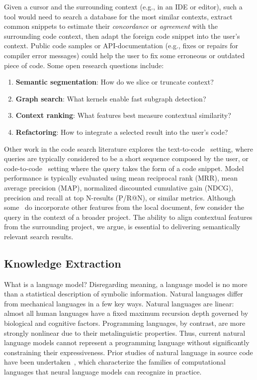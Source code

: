 \documentclass[12pt]{article}
\begin{document}
Given a cursor and the surrounding context (e.g., in an IDE or editor), such a tool would need to search a database for the most similar contexts, extract common snippets to estimate their \textit{concordance} or \textit{agreement} with the surrounding code context, then adapt the foreign code snippet into the user's context. Public code samples or API-documentation (e.g., fixes or repairs for compiler error messages) could help the user to fix some erroneous or outdated piece of code. Some open research questions include:

  \begin{enumerate}
    \item \textbf{Semantic segmentation}: How do we slice or truncate context?
    \item \textbf{Graph search}: What kernels enable fast subgraph detection?
    \item \textbf{Context ranking}: What features best measure contextual similarity?
    \item \textbf{Refactoring}: How to integrate a selected result into the user's code?
  \end{enumerate}


Other work in the code search literature explores the text-to-code~\cite{husain2019codesearchnet} setting, where queries are typically considered to be a short sequence composed by the user, or code-to-code~\cite{kim2018facoy} setting where the query takes the form of a code snippet. Model performance is typically evaluated using mean reciprocal rank (MRR), mean average precision (MAP), normalized discounted cumulative gain (NDCG), precision and recall at top N-results (P/R@N), or similar metrics. Although some~\cite{asyrofi2020ausearch} do incorporate other features from the local document, few consider the query in the context of a broader project. The ability to align contextual features from the surrounding project, we argue, is essential to delivering semantically relevant search results.

  \subsection{Knowledge Extraction}\label{subsec:knowledge-extraction}

What is a language model? Disregarding meaning, a language model is no more than a statistical description of symbolic information. Natural languages differ from mechanical languages in a few key ways. Natural languages are linear: almost all human languages have a fixed maximum recursion depth governed by biological and cognitive factors. Programming languages, by contrast, are more strongly nonlinear due to their metalinguistic properties. Thus, current natural language models cannot represent a programming language without significantly constraining their expressiveness. Prior studies of natural language in source code have been undertaken~\cite{weiss2018practical, chirkova2020empirical, chen2021evaluating}, which characterize the families of computational languages that neural language models can recognize in practice.
\end{document}
